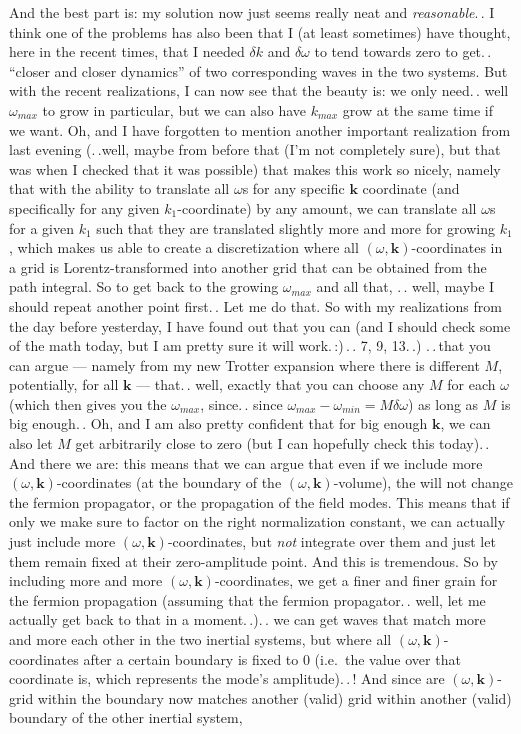 \documentclass{report}
\begin{document}
And the best part is: my solution now just seems really neat and \emph{reasonable}.\,. I think one of the problems has also been that I (at least sometimes) have thought, %
here in the recent times, that I needed $\delta k$ and $\delta \omega$ to tend towards zero to get.\,. ``closer and closer dynamics'' of two corresponding waves in the two systems. But with the recent realizations, I can now see that the beauty is: we only need.\,. well $\omega_{max}$ to grow in particular, but we can also have $k_{max}$ grow at the same time if we want. Oh, and I have forgotten to mention another important realization from last evening (.\,.well, maybe from before that (I'm not completely sure), but that was when I checked that it was possible) that makes this work so nicely, namely that with the ability to translate all $\omega$s for any specific $\boldsymbol{k}$ coordinate (and specifically for any given $k_1$-coordinate) by any amount, we can translate all $\omega$s for a given $k_1$ such that they are translated slightly more and more for growing $k_1$, which makes us able to create a discretization where all $(\omega, \boldsymbol{k})$-coordinates in a grid is Lorentz-transformed into another grid that can be obtained from the path integral. So to get back to the growing $\omega_{max}$ and all that, .\,. well, maybe I should repeat another point first.\,. Let me do that. So with my realizations from the day before yesterday, I have found out that you can (and I should check some of the math today, but I am pretty sure it will work.\,:)\,.\,. 7, 9, 13.\,.) .\,.\,that you can argue --- namely from my new Trotter expansion where there is different $M$, potentially, for all $\boldsymbol{k}$ --- that.\,. well, exactly that you can choose any $M$ for each $\omega$ (which then gives you the $\omega_{max}$, since.\,. since $\omega_{max}- \omega_{min} = M \delta \omega$) as long as $M$ is big enough.\,. Oh, and I am also pretty confident that for big enough $\boldsymbol{k}$, we can also let $M$ get arbitrarily close to zero (but I can hopefully check this today).\,. And there we are: this means that we can argue that even if we include more $(\omega, \boldsymbol{k})$-coordinates (at the boundary of the $(\omega, \boldsymbol{k})$-volume), the will not change the fermion propagator, or the propagation of the field modes. This means that if only we make sure to factor on the right normalization constant, we can actually just include more $(\omega, \boldsymbol{k})$-coordinates, but \emph{not} integrate over them and just let them remain fixed at their zero-amplitude point. And this is tremendous. So by including more and more $(\omega, \boldsymbol{k})$-coordinates, we get a finer and finer grain for the fermion propagation (assuming that the fermion propagator.\,. well, let me actually get back to that in a moment.\,.).\,. we can get waves that match more and more each other in the two inertial systems, but where all $(\omega, \boldsymbol{k})$-coordinates after a certain boundary is fixed to 0 (i.e.\ the value over that coordinate is, which represents the mode's amplitude).\,.\,! And since are $(\omega, \boldsymbol{k})$-grid within the boundary now matches another (valid) grid within another (valid) boundary of the other inertial system, 
\end{document}
